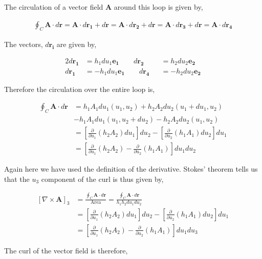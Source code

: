 \documentclass[11pt]{amsart}
\begin{document}
The circulation of a vector field $\mathbf{A}$ around this loop is given by,

\begin{align*}
  \oint_C \mathbf{A}\cdot d\mathbf{r}=\mathbf{A}\cdot d\mathbf{r_1} + d\mathbf{r}=\mathbf{A}\cdot d\mathbf{r_2} + d\mathbf{r}=\mathbf{A}\cdot d\mathbf{r_3} + d\mathbf{r}=\mathbf{A}\cdot d\mathbf{r_4}
\end{align*}

The vectors, $d\mathbf{r_i}$ are given by,

\begin{alignat*}{2}
  d\mathbf{r_1}&=h_1du_1\mathbf{e_1}\qquad d\mathbf{r_2}&&=h_2du_2\mathbf{e_2} \\
  d\mathbf{r_1}&=-h_1du_1\mathbf{e_1}\qquad d\mathbf{r_4}&&=-h_2du_2\mathbf{e_2}
\end{alignat*}

Therefore the circulation over the entire loop is,

\begin{align*}
  \oint_C\mathbf{A}\cdot d\mathbf{r}&=h_1A_1du_1(u_1, u_2) + h_2A_2du_2(u_1+du_1, u_2)\\
                                    &- h_1A_1du_1(u_1, u_2+du_2) - h_2A_2du_2(u_1, u_2) \\
                                    &=\left[\frac{\partial}{\partial u_1}(h_2A_2)du_1\right]du_2 - \left[\frac{\partial}{\partial u_2}(h_1A_1)du_2\right]du_1 \\
                                    &=\left[\frac{\partial}{\partial u_1}(h_2A_2) - \frac{\partial}{\partial u_2}(h_1A_1)\right]du_1 du_2
\end{align*}

Again here we have used the definition of the derivative. Stokes' theorem tells us that the $u_3$ component of the curl is thus given by,

\begin{align*}
  {\left[\nabla\times\mathbf{A}\right]}_3 &= \frac{\oint_C\mathbf{A}\cdot d\mathbf{r}}{\text{Area}} = \frac{\oint_C\mathbf{A}\cdot d\mathbf{r}}{h_1h_2du_1du_2} \\
&=\left[\frac{\partial}{\partial u_1}(h_2A_2)du_1\right]du_2 - \left[\frac{\partial}{\partial u_2}(h_1A_1)du_2\right]du_1 \\
&=\left[\frac{\partial}{\partial u_1}(h_2A_2) - \frac{\partial}{\partial u_2}(h_1A_1)\right]du_1 du_3
\end{align*}

The curl of the vector field is therefore,
\end{document}
